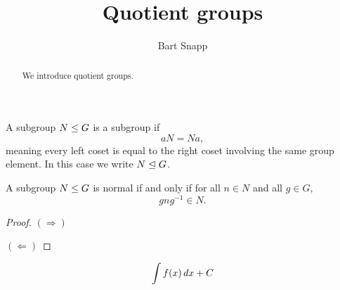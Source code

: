 \documentclass{ximera}
\author{Bart Snapp}
\title{Quotient groups}
\begin{document}
\begin{abstract}
  We introduce quotient groups.
\end{abstract}
\maketitle

\begin{definition}
  A subgroup $N\leq G$ is a  subgroup if
  \[
  aN = Na,
  \]
  meaning every left coset is equal to the right coset involving the
  same group element. In this case we write $N\trianglelefteq G$. 
\end{definition}

\begin{lemma}
  A subgroup $N\leq G$ is normal if and only if for all $n\in N$ and
  all $g\in G$,
  \[
  gng^{-1}\in N.
  \]
  \begin{proof}
    $(\Rightarrow)$

    $(\Leftarrow)$
  \end{proof}
\end{lemma}



\[
\int f(x) \, d x + C
\]
\end{document}
